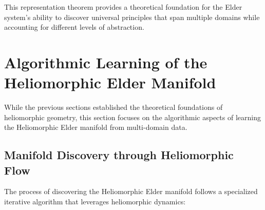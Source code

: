 This representation theorem provides a theoretical foundation for the Elder system's ability to discover universal principles that span multiple domains while accounting for different levels of abstraction.

\section{Algorithmic Learning of the Heliomorphic Elder Manifold}

While the previous sections established the theoretical foundations of heliomorphic geometry, this section focuses on the algorithmic aspects of learning the Heliomorphic Elder manifold from multi-domain data.

\subsection{Manifold Discovery through Heliomorphic Flow}

The process of discovering the Heliomorphic Elder manifold follows a specialized iterative algorithm that leverages heliomorphic dynamics:

